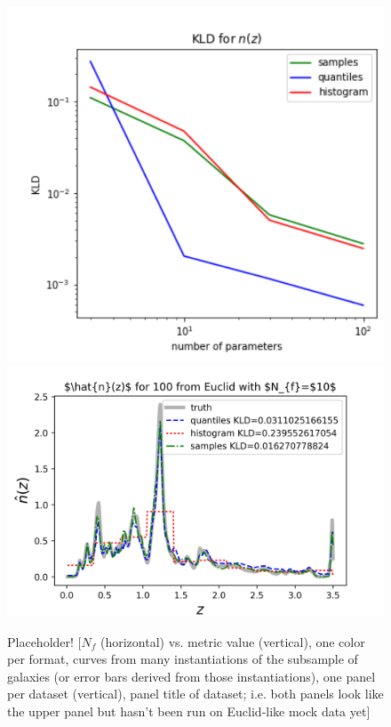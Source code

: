 \documentclass[\docopts]{\docclass}
\begin{document}
\begin{figure}
  
\includegraphics[width=0.9\columnwidth]{figures/lsst_stacked_placeholder.png}\\
  
\includegraphics[width=0.9\columnwidth]{figures/euclid_stacked_placeholder.png}
  \caption{Placeholder!    [$N_{f}$ (horizontal) vs. metric value (vertical), one color per 
format, curves from many instantiations of the subsample of galaxies (or error 
bars derived from those instantiations), one panel per dataset (vertical), 
panel title of dataset; i.e. both panels look like the upper panel but hasn't 
been run on Euclid-like mock data yet]
  \label{fig:stacked}}
\end{figure}
\end{document}
